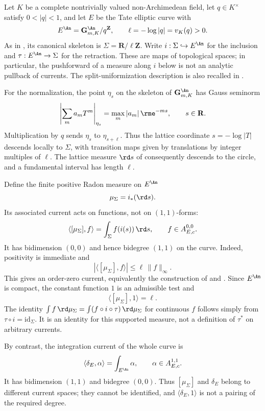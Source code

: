 \begin{example}
\label{ex:ch14-skeleton-current}
Let $K$ be a complete nontrivially valued non-Archimedean field, let
$q\in K^\times$ satisfy $0<|q|<1$, and let $E$ be the Tate elliptic curve
with
\[
 E^{\An}=\mathbf G_{m,K}^{\An}/q^{\mathbf Z},
 \qquad \ell=-\log|q|=v_K(q)>0.
\]
As in , its canonical skeleton is
$\Sigma=\mathbf R/\ell\mathbf Z$.  Write $i:\Sigma\hookrightarrow E^{\An}$
for the inclusion and $\tau:E^{\An}\to\Sigma$ for the retraction.
These are maps of topological spaces; in particular, the pushforward
of a measure along $i$ below is not an analytic pullback of currents.
The split-uniformization description is also recalled in
\cite[paragraphs~19.2.1--19.2.2]{CLD25}.

For the normalization, the point $\eta_s$ on the skeleton of
$\mathbf G_{m,K}^{\An}$ has Gauss seminorm
\[
 \left|\sum_ma_mT^m\right|_{\eta_s}
       =\max_m|a_m|\,\rme^{-ms},\qquad s\in\mathbf R.
\]
Multiplication by $q$ sends $\eta_s$ to $\eta_{s+\ell}$.
Thus the lattice coordinate $s=-\log|T|$ descends locally to $\Sigma$,
with transition maps given by translations by integer multiples of
$\ell$.  The lattice measure $\rd s$ of
 consequently descends to the circle,
and a fundamental interval has length $\ell$.

Define the finite positive Radon measure on $E^{\An}$
\[
                         \mu_\Sigma=i_*(\rd s).
\]
Its associated current acts on functions, not on $(1,1)$-forms:
\[
 \langle[\mu_\Sigma],f\rangle
       =\int_\Sigma f(i(s))\,\rd s,
       \qquad f\in A_{E,c}^{0,0}.
\]
It has bidimension $(0,0)$ and hence bidegree $(1,1)$ on the curve.
Indeed, positivity is immediate and
\[
 |\langle[\mu_\Sigma],f\rangle|
       \leq\ell\,\|f\|_\infty.
\]
This gives an order-zero current, equivalently the construction of
\cite[Proposition~7.2.8]{CLD25} and
.  Since $E^{\An}$ is compact, the
constant function $1$ is an admissible test and
\[
                    \langle[\mu_\Sigma],1\rangle=\ell.
\]
The identity
$\int f\,\rd\mu_\Sigma=\int(f\circ i\circ\tau)\,\rd\mu_\Sigma$
for continuous $f$ follows simply from $\tau\circ i=\mathrm{id}_\Sigma$.
It is an identity for this supported measure, not a definition of
$\tau^*$ on arbitrary currents.

By contrast, the integration current of the whole curve is
\[
 \langle\delta_E,\alpha\rangle=\int_{E^{\An}}\alpha,
       \qquad \alpha\in A_{E,c}^{1,1}.
\]
It has bidimension $(1,1)$ and bidegree $(0,0)$.
Thus $[\mu_\Sigma]$ and $\delta_E$ belong to different current spaces;
they cannot be identified, and $\langle\delta_E,1\rangle$ is not a
pairing of the required degree.


\end{example}
